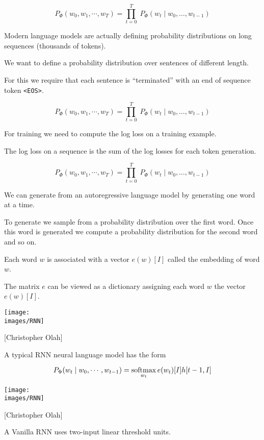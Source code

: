 {\vfill
$$P_\Phi(w_0, w_1, \cdots, w_T) = \prod_{t=0}^T\;P_\Phi(w_t\;|\;w_0,\ldots,w_{t-1})$$

\vfill
Modern language models are actually defining probability distributions on long sequences (thousands of tokens).


We want to define a probability distribution over sentences of different length.

\vfill
For this we require that each sentence is ``terminated'' with an end of sequence token {\tt <EOS>}.


$$P_\Phi(w_0, w_1, \cdots, w_T) = \prod_{t=0}^T\;P_\Phi(w_t\;|\;w_0,\ldots,w_{t-1})$$

\vfill
For training we need to compute the log loss on a training example.

\vfill
The log loss on a sequence is the sum of the log losses for each token generation.

$$P_\Phi(w_0, w_1, \cdots, w_T) = \prod_{t=0}^T\;P_\Phi(w_t\;|\;w_0,\ldots,w_{t-1})$$

\vfill
We can generate from an autoregressive language model by generating one word at a time.

\vfill
To generate we sample from a probability distribution over the first word.  Once this word is generated
we compute a probability distribution for the second word and so on.


Each word $w$ is associated with a vector $e(w)[I]$ called the embedding of word $w$.

\vfill
The matrix $e$ can be viewed as a dictionary assigning each word $w$ the vector $e(w)[I]$.


\centerline{\texttt{[image: \\images/RNN]}}
\centerline{{\large [Christopher Olah]}}

\vfill
A typical RNN neural language model has the form

$$P_\Phi(w_t\;|\;w_0,\cdots,w_{t-1}) = \operatorname*{softmax}_{w_t} e(w_t)[I]h[t-1,I]$$


\centerline{\texttt{[image: \\images/RNN]}}
\centerline{{\large [Christopher Olah]}}

A Vanilla RNN uses two-input linear threshold units.

}
